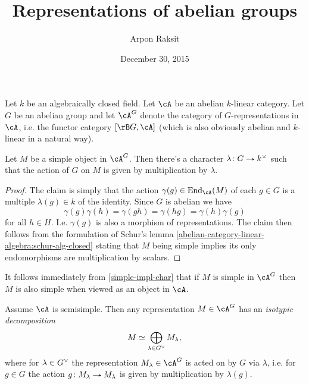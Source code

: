 

\title{Representations of abelian groups}
\author{Arpon Raksit}
\date{December 30, 2015}



\maketitle


Let $k$ be an algebraically closed field. Let $\cA$ be an abelian $k$-linear category. Let $G$ be an abelian group and let $\cA^G$ denote the category of $G$-representations in $\cA$, i.e. the functor category $[\rB G, \cA]$ (which is also obviously abelian and $k$-linear in a natural way).

\begin{proposition}
  \label{simple-impl-char}
  Let $M$ be a simple object in $\cA^G$. Then there's a character $\lambda \c G \to k^\times$ such that the action of $G$ on $M$ is given by multiplication by $\lambda$.
\end{proposition}

\begin{proof}
  The claim is simply that the action $\gamma(g) \in \End_\cA(M)$ of each $g \in G$ is a multiple $\lambda(g) \in k$ of the identity. Since $G$ is abelian we have
  \[
    \gamma(g)\gamma(h) = \gamma(gh) =
    \gamma(hg) = \gamma(h)\gamma(g)
  \]
  for all $h \in H$. I.e. $\gamma(g)$ is also a morphism of representations. The claim then follows from the formulation of Schur's lemma \cref{abelian-category-linear-algebra:schur-alg-closed} stating that $M$ being simple implies its only endomorphisms are multiplication by scalars.
\end{proof}

\begin{remark}
  \label{simple-impl-simple}
  It follows immediately from \cref{simple-impl-char} that if $M$ is simple in $\cA^G$ then $M$ is also simple when viewed as an object in $\cA$.
\end{remark}

\begin{corollary}
  \label{isotypic}
  Assume $\cA$ is semisimple. Then any representation $M \in \cA^G$ has an \emph{isotypic decomposition}
  \[
    M \simeq \bigoplus_{\lambda \in G^\vee} M_\lambda,
  \]
  where for $\lambda \in G^\vee$ the representation $M_\lambda \in \cA^G$ is acted on by $G$ via $\lambda$, i.e. for $g \in G$ the action $g \c M_\lambda \to M_\lambda$ is given by multiplication by $\lambda(g)$.
\end{corollary}

